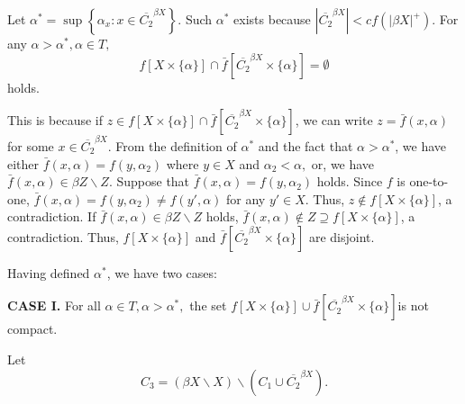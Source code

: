 \documentclass{article}
\begin{document}
																																				  Let $\alpha^* = \sup \left\{\alpha_x: x\in \overline{C_2}^{\beta X}\right\}.$ Such $\alpha^*$ exists because $\left| \overline{C_2}^{\beta X} \right| <cf(|\beta X|^+).$  For any $\alpha>\alpha^*, \alpha \in T,$
																																				  $$f\left[X\times \{\alpha\}\right] \cap \bar{f}\left[\overline{C_2}^{\beta X} \times \{\alpha\}\right] = \emptyset$$ holds. 

																																				  This is because if $z\in f\left[X\times \{\alpha\}\right] \cap \bar{f} \left[\overline{C_2}^{\beta X} \times \{\alpha\} \right]$, we can write $z=\bar{f}(x,\alpha)$ for some $x\in \overline{C_2}^{\beta X}$. From the definition of $\alpha^*$ and the fact that $\alpha>\alpha^*$, we have either $\bar{f}(x,\alpha)=f(y,\alpha_2)$ where $y\in X$ and $\alpha_2<\alpha,$ or, we have $\bar{f}(x,\alpha)\in \beta Z\backslash Z.$ Suppose that $\bar{f}(x,\alpha)=f(y,\alpha_2)$ holds. Since $f$ is one-to-one, $\bar{f}(x,\alpha)=f(y,\alpha_2)\neq f(y',\alpha)$ for any $y'\in X.$ Thus, $z\notin f\left[X\times \{\alpha\}\right] $, a contradiction. If $\bar{f}(x,\alpha)\in \beta Z\backslash Z$ holds, $\bar{f} (x,\alpha)\notin Z \supseteq f\left[X\times \{\alpha\}\right]$, a contradiction. Thus, $f\left[X\times \{\alpha\}\right] $ and $\bar{f}\left[\overline{C_2}^{\beta X} \times \{\alpha\}\right]$ are disjoint.

																																				  \vskip 25pt


																																				  Having defined $\alpha^*$, we have two cases: 

																																				  \vskip 20pt

																																				  \textbf{CASE I.} For all $\alpha \in T, \alpha>\alpha^*,$ the set $f\left[X\times\{\alpha\}\right] \cup \bar{f}\left[\overline{C_2}^{\beta X} \times \{\alpha\}\right] $is not compact. 

																																				  \vskip 20pt

																																				  Let $$C_3=(\beta X\backslash X) \backslash (C_1\cup \overline{C_2}^{\beta X}).$$
\end{document}
